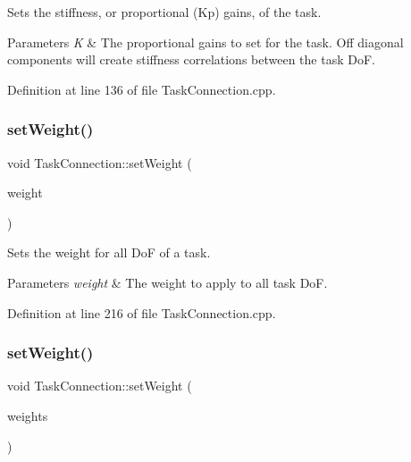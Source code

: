 Sets the stiffness, or proportional (Kp) gains, of the task. 
\begin{DoxyParams}{Parameters}
{\em K} & The proportional gains to set for the task. Off diagonal components will create stiffness correlations between the task DoF. \\
\hline
\end{DoxyParams}


Definition at line 136 of file Task\+Connection.\+cpp.

\hypertarget{classocra__recipes_1_1TaskConnection_ad833849636700c3174f305d10fcc00bf}{}\label{classocra__recipes_1_1TaskConnection_ad833849636700c3174f305d10fcc00bf} 
\subsubsection{\texorpdfstring{set\+Weight()}{setWeight()}\hspace{0.1cm}{\footnotesize\ttfamily [1/2]}}
{\footnotesize\ttfamily void Task\+Connection\+::set\+Weight (\begin{DoxyParamCaption}\item[{double}]{weight }\end{DoxyParamCaption})}

Sets the weight for all DoF of a task. 
\begin{DoxyParams}{Parameters}
{\em weight} & The weight to apply to all task DoF. \\
\hline
\end{DoxyParams}


Definition at line 216 of file Task\+Connection.\+cpp.

\hypertarget{classocra__recipes_1_1TaskConnection_ad03415eb9f2107be39cb44399fb0afd7}{}\label{classocra__recipes_1_1TaskConnection_ad03415eb9f2107be39cb44399fb0afd7} 
\subsubsection{\texorpdfstring{set\+Weight()}{setWeight()}\hspace{0.1cm}{\footnotesize\ttfamily [2/2]}}
{\footnotesize\ttfamily void Task\+Connection\+::set\+Weight (\begin{DoxyParamCaption}\item[{Eigen\+::\+Vector\+Xd \&}]{weights }\end{DoxyParamCaption})}

